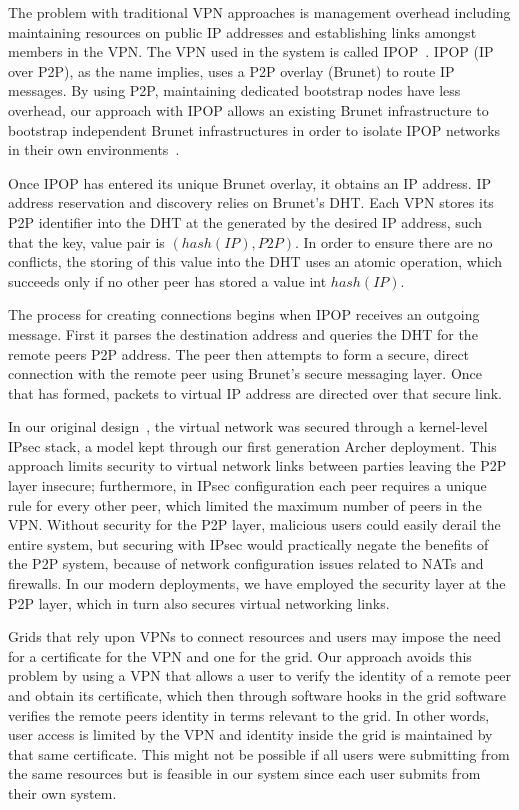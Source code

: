 \documentclass[twocolumn]{svjour3}
\begin{document}
The problem with traditional VPN approaches is management overhead including
maintaining resources on public IP addresses and establishing links amongst
members in the VPN.  The VPN used in the system is called
IPOP~\cite{groupvpn,ipop}.  IPOP (IP over P2P), as the name implies, uses a P2P
overlay (Brunet) to route IP messages.  By using P2P, maintaining dedicated
bootstrap nodes have less overhead, our approach with IPOP allows an existing
Brunet infrastructure to bootstrap independent Brunet infrastructures in order
to isolate IPOP networks in their own environments~\cite{bootstrapping}.

Once IPOP has entered its unique Brunet overlay, it obtains an IP address.  IP
address reservation and discovery relies on Brunet's DHT.  Each VPN stores its
P2P identifier into the DHT at the generated by the desired IP address, such
that the key, value pair is $(hash(IP), P2P)$.  In order to ensure there are no
conflicts, the storing of this value into the DHT uses an atomic operation,
which succeeds only if no other peer has stored a value int $hash(IP)$.

The process for creating connections begins when IPOP receives an outgoing
message.  First it parses the destination address and queries the DHT for the
remote peers P2P address.  The peer then attempts to form a secure, direct
connection with the remote peer using Brunet's secure messaging layer.  Once
that has formed, packets to virtual IP address are directed over that secure
link.

In our original design~\cite{vtdc}, the virtual network was secured through a
kernel-level IPsec stack, a model kept through our first generation Archer
deployment.  This approach limits security to virtual network links between
parties leaving the P2P layer insecure; furthermore, in IPsec configuration
each peer requires a unique rule for every other peer, which limited the
maximum number of peers in the VPN.  Without security for the P2P layer,
malicious users could easily derail the entire system, but securing with IPsec
would practically negate the benefits of the P2P system, because of network
configuration issues related to NATs and firewalls.  In our modern deployments,
we have employed the security layer at the P2P layer, which in turn also
secures virtual networking links.

Grids that rely upon VPNs to connect resources and users may impose the need
for a certificate for the VPN and one for the grid.  Our approach avoids this
problem by using a VPN that allows a user to verify the identity of a remote
peer and obtain its certificate, which then through software hooks in the grid
software verifies the remote peers identity in terms relevant to the grid.  In
other words, user access is limited by the VPN and identity inside the grid is
maintained by that same certificate.  This might not be possible if all users
were submitting from the same resources but is feasible in our system since
each user submits from their own system.
\end{document}

